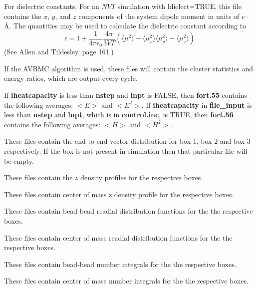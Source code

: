 \documentclass[12pt,letterpaper]{article}
\begin{document}
 For dielectric constants. For an
$NVT$ simulation with ldielect=TRUE, this file contains
the $x$, $y$, and $z$ components of the system dipole moment
in units of $e\cdot$\AA. The quantities may be used to
calculate the dielectric constant according to
\begin{equation}
\epsilon = 1 + \frac{1}{4\pi\epsilon_0} \frac{4 \pi}{3VT} \left ( \langle \mu^2 \rangle - \langle \mu_x^2 \rangle
 \langle \mu_y^2 \rangle - \langle \mu_z^2 \rangle \right )
\end{equation}
(See Allen and Tildesley, page 161.)

 If the AVBMC
algorithm is used, these files will contain the cluster
statistics and energy ratios, which are output every cycle.

 If {\bf iheatcapacity} is
less than {\bf nstep} and {\bf lnpt} is FALSE, then {\bf
  fort.55} contains the following averages: $<E>$ and
$<E^2>$. If {\bf iheatcapacity} in {\bf file\_input} is less
than {\bf nstep} and {\bf lnpt}, which is in {\bf
  control.inc}, is TRUE, then {\bf fort.56} contains the
following averages: $<H>$ and $<H^2>$.

These files contain the end to end vector distribution for
box 1, box 2 and box 3 respectively. If the box is not
present in simulation then that particular file will be
empty.

 These
files contain the $z$ density profiles for the respective
boxes.

These files contain center of mass z density profile for the
respective boxes.

These files contain bead-bead readial distribution functions
for the the respective boxes.

These files contain center of mass readial distribution
functions for the the respective boxes.

These files contain bead-bead number integrals for the the
respective boxes.

These files contain center of mass number integrals for the
the respective boxes.
\end{document}
